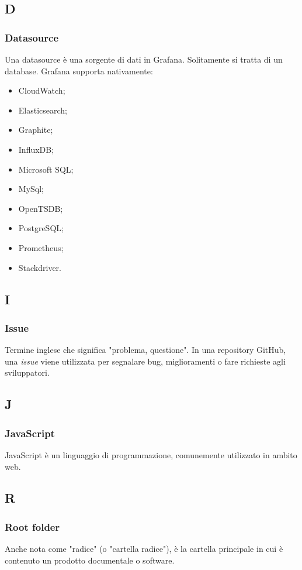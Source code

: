 \appendix
{}
\subsection*{D}

\subsubsection*{Datasource}
\label{sec:datasource} 
Una datasource è una sorgente di dati in Grafana. Solitamente si tratta di un database. Grafana supporta nativamente:
	\begin{itemize}
	\item CloudWatch;
	\item Elasticsearch;
	\item Graphite;
	\item InfluxDB;
	\item Microsoft SQL;
	\item MySql;
	\item OpenTSDB;
	\item PostgreSQL;
	\item Prometheus;
	\item Stackdriver.
	\end{itemize}

\subsection*{I}
\subsubsection*{Issue}
\label{sec:issue}
Termine inglese che significa "problema, questione". In una repository GitHub, una \textit{issue} viene utilizzata per segnalare bug, miglioramenti o fare richieste agli sviluppatori.

\subsection*{J}
	\subsubsection*{JavaScript}
	\label{sec:javascript}
	JavaScript è un linguaggio di programmazione, comunemente utilizzato in ambito web.
	
\subsection*{R}
\subsubsection*{Root folder}
\label{sec:radice}
Anche nota come "radice" (o "cartella radice"), è la cartella principale in cui è contenuto un prodotto documentale o software. 